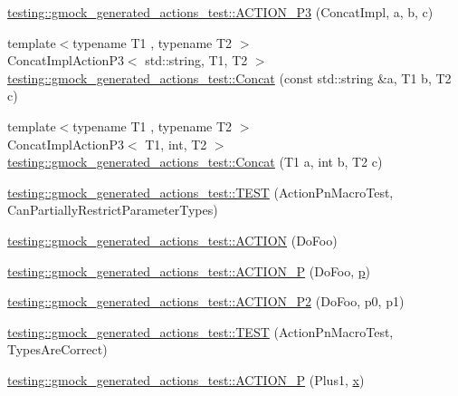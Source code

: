 \begin{DoxyCompactItemize}
\item 
\mbox{\hyperlink{namespacetesting_1_1gmock__generated__actions__test_ae46434959151b83249e52d4869e28cf0}{testing\+::gmock\+\_\+generated\+\_\+actions\+\_\+test\+::\+A\+C\+T\+I\+O\+N\+\_\+\+P3}} (Concat\+Impl, a, b, c)
\item 
{\footnotesize template$<$typename T1 , typename T2 $>$ }\\Concat\+Impl\+Action\+P3$<$ std\+::string, T1, T2 $>$ \mbox{\hyperlink{namespacetesting_1_1gmock__generated__actions__test_aad9da9ba94e4ba373284d13305eda7e5}{testing\+::gmock\+\_\+generated\+\_\+actions\+\_\+test\+::\+Concat}} (const std\+::string \&a, T1 b, T2 c)
\item 
{\footnotesize template$<$typename T1 , typename T2 $>$ }\\Concat\+Impl\+Action\+P3$<$ T1, int, T2 $>$ \mbox{\hyperlink{namespacetesting_1_1gmock__generated__actions__test_ab7e41148b644bc80a67a90d584691978}{testing\+::gmock\+\_\+generated\+\_\+actions\+\_\+test\+::\+Concat}} (T1 a, int b, T2 c)
\item 
\mbox{\hyperlink{namespacetesting_1_1gmock__generated__actions__test_a7222610b197216e7976b3fa751f97daf}{testing\+::gmock\+\_\+generated\+\_\+actions\+\_\+test\+::\+T\+E\+ST}} (Action\+Pn\+Macro\+Test, Can\+Partially\+Restrict\+Parameter\+Types)
\item 
\mbox{\hyperlink{namespacetesting_1_1gmock__generated__actions__test_a183b3863b3c2319ac414fe694455f58c}{testing\+::gmock\+\_\+generated\+\_\+actions\+\_\+test\+::\+A\+C\+T\+I\+ON}} (Do\+Foo)
\item 
\mbox{\hyperlink{namespacetesting_1_1gmock__generated__actions__test_a8487a3396f4f705e134e44584634ef1c}{testing\+::gmock\+\_\+generated\+\_\+actions\+\_\+test\+::\+A\+C\+T\+I\+O\+N\+\_\+P}} (Do\+Foo, \mbox{\hyperlink{_obj__test_2lib_2googletest-master_2googlemock_2test_2gmock-matchers__test_8cc_a6bc6b007533335efe02bafff799ec64c}{p}})
\item 
\mbox{\hyperlink{namespacetesting_1_1gmock__generated__actions__test_acd38e742235e154ad309f22e9a470a86}{testing\+::gmock\+\_\+generated\+\_\+actions\+\_\+test\+::\+A\+C\+T\+I\+O\+N\+\_\+\+P2}} (Do\+Foo, p0, p1)
\item 
\mbox{\hyperlink{namespacetesting_1_1gmock__generated__actions__test_ad702feced8b71b3708782b1a2274453e}{testing\+::gmock\+\_\+generated\+\_\+actions\+\_\+test\+::\+T\+E\+ST}} (Action\+Pn\+Macro\+Test, Types\+Are\+Correct)
\item 
\mbox{\hyperlink{namespacetesting_1_1gmock__generated__actions__test_a89c01b82e854ad79e3d139aa72477747}{testing\+::gmock\+\_\+generated\+\_\+actions\+\_\+test\+::\+A\+C\+T\+I\+O\+N\+\_\+P}} (Plus1, \mbox{\hyperlink{_obj__test_2lib_2googletest-master_2googlemock_2test_2gmock-matchers__test_8cc_a6150e0515f7202e2fb518f7206ed97dc}{x}})

\end{DoxyCompactItemize}

